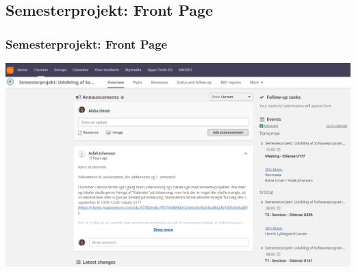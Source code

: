 \documentclass[t, aspectratio=169]{beamer}
\begin{document}
\subsection{Semesterprojekt: Front Page}
\begin{frame}[fragile]
  \frametitle{Semesterprojekt: Front Page}
  \vspace{-1mm}
  \begin{center}
    \includegraphics[width=13.4cm]{figs/itslearning/overview.png}
  \end{center}
\end{frame}
\end{document}
